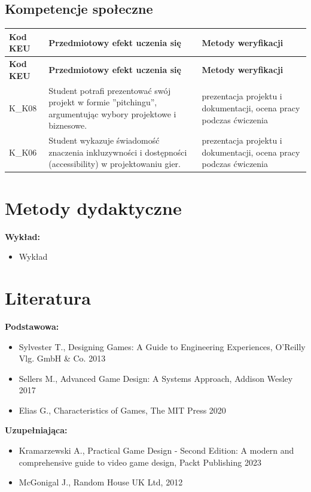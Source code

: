 \documentclass[12pt, a4paper]{article}
\newcommand{\thdrule}{\noalign{\global\setlength{\extrarowheight}{0pt}}}
\newcommand{\thdend}{\noalign{\global\setlength{\extrarowheight}{3pt}}}
\begin{document}
\subsection*{Kompetencje społeczne}
{\scriptsize
\begin{longtable}{m{1.6cm}m{9.0cm}m{4.2cm}}
\thdrule\toprule
\rowcolor{pjatkRed} {\color{white}\footnotesize\textbf{\vphantom{Ag}Kod KEU}} & {\color{white}\footnotesize\textbf{\vphantom{Ag}Przedmiotowy efekt uczenia się}} & {\color{white}\footnotesize\textbf{\vphantom{Ag}Metody weryfikacji}} \\
\midrule\thdend
\endfirsthead
\thdrule\toprule
\rowcolor{pjatkRed} {\color{white}\footnotesize\textbf{\vphantom{Ag}Kod KEU}} & {\color{white}\footnotesize\textbf{\vphantom{Ag}Przedmiotowy efekt uczenia się}} & {\color{white}\footnotesize\textbf{\vphantom{Ag}Metody weryfikacji}} \\
\midrule\thdend
\endhead
  \rowcolor{tableRowLight} K\_K08 & Student potrafi prezentować swój projekt w formie ''pitchingu'', argumentując wybory projektowe i biznesowe. & prezentacja projektu i dokumentacji, ocena pracy podczas ćwiczenia \\
  \rowcolor{tableRowAlt} K\_K06 & Student wykazuje świadomość znaczenia inkluzywności i dostępności (accessibility) w projektowaniu gier. & prezentacja projektu i dokumentacji, ocena pracy podczas ćwiczenia \\
\bottomrule
\end{longtable}}

\section{Metody dydaktyczne}

\textbf{Wykład:}
\begin{itemize}
  \item Wykład
\end{itemize}
\vspace{4pt}


\section{Literatura}

\textbf{Podstawowa:}
\begin{itemize}
  \item Sylvester T., Designing Games: A Guide to Engineering Experiences, O'Reilly Vlg. GmbH \& Co. 2013
  \item Sellers M., Advanced Game Design: A Systems Approach, Addison Wesley 2017
  \item Elias G., Characteristics of Games, The MIT Press 2020
\end{itemize}

\textbf{Uzupełniająca:}
\begin{itemize}
  \item Kramarzewski A., Practical Game Design - Second Edition: A modern and comprehensive guide to video game design, Packt Publishing 2023
  \item McGonigal J., Random House UK Ltd, 2012
\end{itemize}
\end{document}

